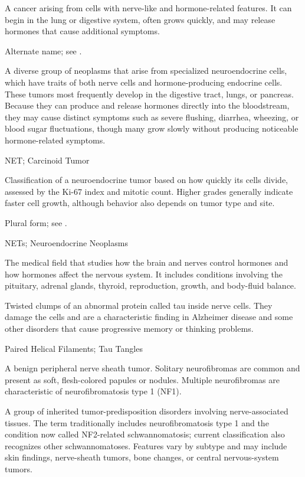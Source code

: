  A cancer arising from cells with nerve-like and hormone-related features. It can begin in the lung or digestive system, often grows quickly, and may release hormones that cause additional symptoms.

 Alternate name; see .

 A diverse group of neoplasms that arise from specialized neuroendocrine cells, which have traits of both nerve cells and hormone-producing endocrine cells. These tumors most frequently develop in the digestive tract, lungs, or pancreas. Because they can produce and release hormones directly into the bloodstream, they may cause distinct symptoms such as severe flushing, diarrhea, wheezing, or blood sugar fluctuations, though many grow slowly without producing noticeable hormone-related symptoms.

\synonyms
NET; Carcinoid Tumor

 Classification of a neuroendocrine tumor based on how quickly its cells divide, assessed by the Ki-67 index and mitotic count. Higher grades generally indicate faster cell growth, although behavior also depends on tumor type and site.

 Plural form; see .

\synonyms
NETs; Neuroendocrine Neoplasms

 The medical field that studies how the brain and nerves control hormones and how hormones affect the nervous system. It includes conditions involving the pituitary, adrenal glands, thyroid, reproduction, growth, and body-fluid balance.

 Twisted clumps of an abnormal protein called tau inside nerve cells. They damage the cells and are a characteristic finding in Alzheimer disease and some other disorders that cause progressive memory or thinking problems.

\synonyms
Paired Helical Filaments; Tau Tangles

 A benign peripheral nerve sheath tumor. Solitary neurofibromas are common and present as
soft, flesh-colored papules or nodules. Multiple neurofibromas are characteristic of
neurofibromatosis type 1 (NF1).

 A group of inherited tumor-predisposition disorders involving nerve-associated tissues. The term traditionally includes neurofibromatosis type 1 and the condition now called NF2-related schwannomatosis; current classification also recognizes other schwannomatoses. Features vary by subtype and may include skin findings, nerve-sheath tumors, bone changes, or central nervous-system tumors.

